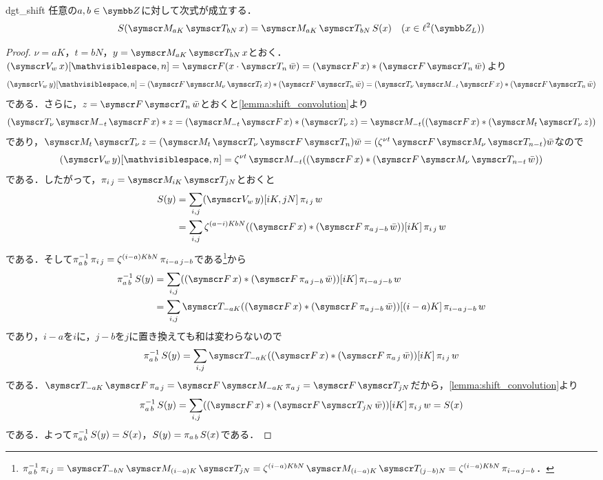 \documentclass[../../main]{subfiles}
\begin{document}
\begin{lemma}{}{dgt_shift}
  任意の\(a,b\in\numset{Z}\)に対して次式が成立する．
  \[
    S(\modulate{aK}\translate{bN}x) = \modulate{aK}\translate{bN}S(x)\quad(x\in\cycles{L})
  \]
\end{lemma}

\begin{proof}
  \(\nu=aK\)，\(t=bN\)，\(y=\modulate{aK}\translate{bN}x\)とおく．\((\stft{w}x)[\holder,n]=\ftrans(x\cdot\translate{n}\conj{w})=(\ftrans x)\circconv(\ftrans\translate{n}\conj{w})\)より
  \[
    (\stft{w}y)[\holder,n] = (\ftrans\modulate{\nu}\translate{t}x)\circconv(\ftrans\translate{n}\conj{w})
    = (\translate{\nu}\modulate{-t}\ftrans x)\circconv(\ftrans\translate{n}\conj{w})
  \]
  である．さらに，\(z=\ftrans\translate{n}\conj{w}\)とおくと\cref{lemma:shift_convolution}より
  \[
    (\translate{\nu}\modulate{-t}\ftrans x)\circconv z = (\modulate{-t}\ftrans x)\circconv(\translate{\nu}z)
    = \modulate{-t}((\ftrans x)\circconv(\modulate{t}\translate{\nu}z))
  \]
  であり，\(\modulate{t}\translate{\nu}z=(\modulate{t}\translate{\nu}\ftrans\translate{n})\conj{w}=(\zeta^{\nu t}\ftrans\modulate{\nu}\translate{n-t})\conj{w}\)なので
  \[
    (\stft{w}y)[\holder,n] = \zeta^{\nu t}\modulate{-t}((\ftrans x)\circconv(\ftrans\modulate{\nu}\translate{n-t}\conj{w}))
  \]
  である．したがって，\(\tfshift{i}{j}=\modulate{iK}\translate{jN}\)とおくと
  \begin{align*}
    S(y) &= \sum_{i,j}(\stft{w}y)[iK,jN]\tfshift{i}{j}w \\
    &= \sum_{i,j}\zeta^{(a-i)KbN}((\ftrans x)\circconv(\ftrans\tfshift{a}{j-b}\conj{w}))[iK]\tfshift{i}{j}w
  \end{align*}
  である．そして\(\tfshift*{a}{b}\tfshift{i}{j}=\zeta^{(i-a)KbN}\tfshift{i-a}{j-b}\)である\footnote{\(\tfshift*{a}{b}\tfshift{i}{j}=\translate{-bN}\modulate{(i-a)K}\translate{jN}=\zeta^{(i-a)KbN}\modulate{(i-a)K}\translate{(j-b)N}=\zeta^{(i-a)KbN}\tfshift{i-a}{j-b}\)．}から
  \begin{align*}
    \tfshift*{a}{b}S(y) &= \sum_{i,j}((\ftrans x)\circconv(\ftrans\tfshift{a}{j-b}\conj{w}))[iK]\tfshift{i-a}{j-b}w \\
    &= \sum_{i,j}\translate{-aK}((\ftrans x)\circconv(\ftrans\tfshift{a}{j-b}\conj{w}))[(i-a)K]\tfshift{i-a}{j-b}w
  \end{align*}
  であり，\(i-a\)を\(i\)に，\(j-b\)を\(j\)に置き換えても和は変わらないので
  \[
    \tfshift*{a}{b}S(y) = \sum_{i,j}\translate{-aK}((\ftrans x)\circconv(\ftrans\tfshift{a}{j}\conj{w}))[iK]\tfshift{i}{j}w
  \]
  である．\(\translate{-aK}\ftrans\tfshift{a}{j}=\ftrans\modulate{-aK}\tfshift{a}{j}=\ftrans\translate{jN}\)だから，\cref{lemma:shift_convolution}より
  \[
    \tfshift*{a}{b}S(y) = \sum_{i,j}((\ftrans x)\circconv(\ftrans\translate{jN}\conj{w}))[iK]\tfshift{i}{j}w
    = S(x)
  \]
  である．よって\(\tfshift*{a}{b}S(y)=S(x)\)，\(S(y)=\tfshift{a}{b}S(x)\)である．
\end{proof}
\end{document}
